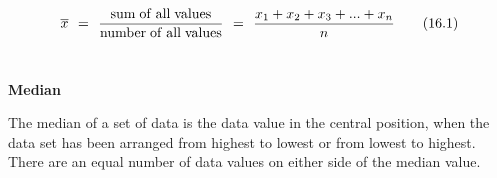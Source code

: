 \begin{description}
\begin{description}
{\begin{equation}
    \overline{x}\phantom{\rule{4pt}{0ex}}=\phantom{\rule{4pt}{0ex}}\frac{\mathrm{sum\; of\; all\; values}}{\mathrm{number\; of\; all\; values}}\phantom{\rule{4pt}{0ex}}=\phantom{\rule{4pt}{0ex}}\frac{{x}_{1}+{x}_{2}+{x}_{3}+...+{x}_{n}}{n}\tag{16.1}
      \end{equation}
    }
          \\\end{description}
	    \item[] \noindent\raggedright {\bf  Median }\\\begin{description}\item{\hspace{.3cm}}\hspace{.3cm}
          \label{m39400*id211687}The median of a set of data is the data value in the central position, when the data set has been arranged from highest to lowest or from lowest to highest. There are an equal number of data values on either side of the median value. \par 
          \\\end{description}

\end{description}
